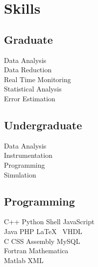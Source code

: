 \documentclass[letterpaper]{deedy-resume} %
\begin{document}
\begin{minipage}[t]{0.33\textwidth}
\sectionspace %


\section{Skills}

\subsection{Graduate}

Data Analysis \\
Data Reduction \\
Real Time Monitoring \\
Statistical Analysis \\
Error Estimation \\

\sectionspace %


\subsection{Undergraduate}

Data Analysis \\
Instrumentation \\
Programming \\
Simulation \\

\sectionspace %


\subsection{Programming}

C++ \textbullet{} Python \textbullet{} Shell \textbullet{} JavaScript \\
Java \textbullet{} PHP \textbullet{} \textbullet{} \LaTeX\ \textbullet{} VHDL \\ 
C \textbullet{} CSS \textbullet{} Assembly \textbullet{} MySQL \\
 Fortran \textbullet{} Mathematica \\
Matlab \textbullet{} XML


\end{minipage}
\end{document}
